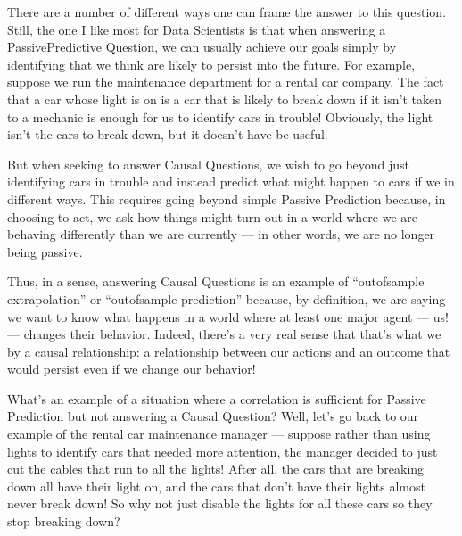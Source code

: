 \documentclass[letterpaper,10pt,english]{jupyterBook}
\begin{document}
\sphinxAtStartPar
There are a number of different ways one can frame the answer to this question. Still, the one I like most for Data Scientists is that when answering a Passive\sphinxhyphen{}Predictive Question, we can usually achieve our goals simply by identifying  that we think are likely to persist into the future. For example, suppose we run the maintenance department for a rental car company. The fact that a car whose  light is on is a car that is likely to break down if it isn’t taken to a mechanic is enough for us to identify cars in trouble! Obviously, the  light isn’t  the cars to break down, but it doesn’t have be useful.

\sphinxAtStartPar
But when seeking to answer Causal Questions, we wish to go beyond just identifying cars in trouble and instead predict what might happen to cars if we  in different ways. This requires going beyond simple Passive Prediction because, in choosing to act, we ask how things might turn out in a world where we are behaving differently than we are currently — in other words, we are no longer being passive.

\sphinxAtStartPar
Thus, in a sense, answering Causal Questions is  an example of “out\sphinxhyphen{}of\sphinxhyphen{}sample extrapolation” or “out\sphinxhyphen{}of\sphinxhyphen{}sample prediction” because, by definition, we are saying we want to know what happens in a world where at least one major agent — us! — changes their behavior. Indeed, there’s a very real sense that that’s what we  by a causal relationship: a relationship between our actions and an outcome that would persist even if we change our behavior!

\sphinxAtStartPar
What’s an example of a situation where a correlation is sufficient for Passive Prediction but not answering a Causal Question? Well, let’s go back to our example of the rental car maintenance manager — suppose rather than using  lights to identify cars that needed more attention, the manager decided to just cut the cables that run to all the  lights! After all, the cars that are breaking down all have their  light on, and the cars that don’t have their  lights almost never break down! So why not just disable the  lights for all these cars so they stop breaking down?
\end{document}
